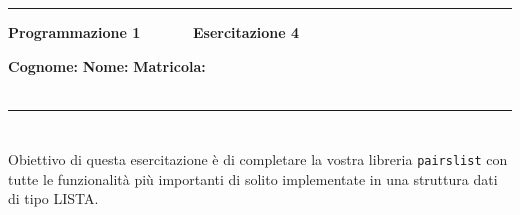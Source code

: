 \documentclass[11pt,a4]{article}
\begin{document}
\thispagestyle{empty}
\hrule
\begin{center}
   {\Large {\bf Programmazione 1 \hspace{3cm} $\quad \quad \quad$ Esercitazione 4}}
\end{center}
{\bf Cognome: }\hspace{2.5cm} {\bf Nome: } \hspace{2.5cm} {\bf Matricola: } \\\
\hrule

\section*{}

Obiettivo di questa esercitazione è di completare la vostra libreria {\tt pairslist} con tutte le funzionalità
più importanti di solito implementate in una struttura dati di tipo LISTA.
\end{document}
